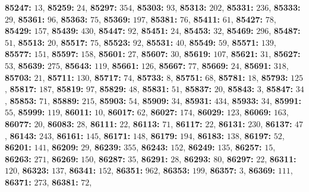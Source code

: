 \textsf{\bfseries 85247:} $13$, \textsf{\bfseries 85259:} $24$, \textsf{\bfseries 85297:} $354$, \textsf{\bfseries 85303:} $93$, \textsf{\bfseries 85313:} $202$, \textsf{\bfseries 85331:} $236$, \textsf{\bfseries 85333:} $29$, \textsf{\bfseries 85361:} $96$, \textsf{\bfseries 85363:} $75$, \textsf{\bfseries 85369:} $197$, \textsf{\bfseries 85381:} $76$, \textsf{\bfseries 85411:} $61$, \textsf{\bfseries 85427:} $78$, \textsf{\bfseries 85429:} $157$, \textsf{\bfseries 85439:} $430$, \textsf{\bfseries 85447:} $92$, \textsf{\bfseries 85451:} $24$, \textsf{\bfseries 85453:} $32$, \textsf{\bfseries 85469:} $296$, \textsf{\bfseries 85487:} $51$, \textsf{\bfseries 85513:} $20$, \textsf{\bfseries 85517:} $75$, \textsf{\bfseries 85523:} $92$, \textsf{\bfseries 85531:} $40$, \textsf{\bfseries 85549:} $59$, \textsf{\bfseries 85571:} $139$, \textsf{\bfseries 85577:} $151$, \textsf{\bfseries 85597:} $158$, \textsf{\bfseries 85601:} $27$, \textsf{\bfseries 85607:} $30$, \textsf{\bfseries 85619:} $107$, \textsf{\bfseries 85621:} $31$, \textsf{\bfseries 85627:} $53$, \textsf{\bfseries 85639:} $275$, \textsf{\bfseries 85643:} $119$, \textsf{\bfseries 85661:} $126$, \textsf{\bfseries 85667:} $77$, \textsf{\bfseries 85669:} $24$, \textsf{\bfseries 85691:} $318$, \textsf{\bfseries 85703:} $21$, \textsf{\bfseries 85711:} $130$, \textsf{\bfseries 85717:} $74$, \textsf{\bfseries 85733:} $8$, \textsf{\bfseries 85751:} $68$, \textsf{\bfseries 85781:} $18$, \textsf{\bfseries 85793:} $125$, \textsf{\bfseries 85817:} $187$, \textsf{\bfseries 85819:} $97$, \textsf{\bfseries 85829:} $48$, \textsf{\bfseries 85831:} $51$, \textsf{\bfseries 85837:} $20$, \textsf{\bfseries 85843:} $3$, \textsf{\bfseries 85847:} $34$, \textsf{\bfseries 85853:} $71$, \textsf{\bfseries 85889:} $215$, \textsf{\bfseries 85903:} $54$, \textsf{\bfseries 85909:} $34$, \textsf{\bfseries 85931:} $434$, \textsf{\bfseries 85933:} $34$, \textsf{\bfseries 85991:} $55$, \textsf{\bfseries 85999:} $119$, \textsf{\bfseries 86011:} $10$, \textsf{\bfseries 86017:} $62$, \textsf{\bfseries 86027:} $174$, \textsf{\bfseries 86029:} $123$, \textsf{\bfseries 86069:} $163$, \textsf{\bfseries 86077:} $20$, \textsf{\bfseries 86083:} $28$, \textsf{\bfseries 86111:} $22$, \textsf{\bfseries 86113:} $71$, \textsf{\bfseries 86117:} $22$, \textsf{\bfseries 86131:} $230$, \textsf{\bfseries 86137:} $47$, \textsf{\bfseries 86143:} $243$, \textsf{\bfseries 86161:} $145$, \textsf{\bfseries 86171:} $148$, \textsf{\bfseries 86179:} $194$, \textsf{\bfseries 86183:} $138$, \textsf{\bfseries 86197:} $52$, \textsf{\bfseries 86201:} $141$, \textsf{\bfseries 86209:} $29$, \textsf{\bfseries 86239:} $355$, \textsf{\bfseries 86243:} $152$, \textsf{\bfseries 86249:} $135$, \textsf{\bfseries 86257:} $15$, \textsf{\bfseries 86263:} $271$, \textsf{\bfseries 86269:} $150$, \textsf{\bfseries 86287:} $35$, \textsf{\bfseries 86291:} $28$, \textsf{\bfseries 86293:} $80$, \textsf{\bfseries 86297:} $22$, \textsf{\bfseries 86311:} $120$, \textsf{\bfseries 86323:} $137$, \textsf{\bfseries 86341:} $152$, \textsf{\bfseries 86351:} $962$, \textsf{\bfseries 86353:} $199$, \textsf{\bfseries 86357:} $3$, \textsf{\bfseries 86369:} $111$, \textsf{\bfseries 86371:} $273$, \textsf{\bfseries 86381:} $72$, 
